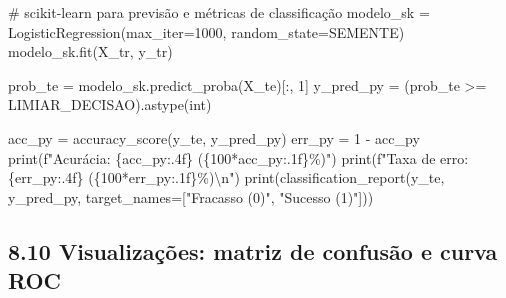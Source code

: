 \documentclass[
  letterpaper,
  DIV=11,
  numbers=noendperiod]{scrartcl}
\newenvironment{Shaded}{\begin{snugshade}}{\end{snugshade}}
\newcommand{\BuiltInTok}[1]{\textcolor[rgb]{0.00,0.23,0.31}{#1}}
\newcommand{\CharTok}[1]{\textcolor[rgb]{0.13,0.47,0.30}{#1}}
\newcommand{\CommentTok}[1]{\textcolor[rgb]{0.37,0.37,0.37}{#1}}
\newcommand{\DecValTok}[1]{\textcolor[rgb]{0.68,0.00,0.00}{#1}}
\newcommand{\NormalTok}[1]{\textcolor[rgb]{0.00,0.23,0.31}{#1}}
\newcommand{\OperatorTok}[1]{\textcolor[rgb]{0.37,0.37,0.37}{#1}}
\newcommand{\SpecialCharTok}[1]{\textcolor[rgb]{0.37,0.37,0.37}{#1}}
\newcommand{\SpecialStringTok}[1]{\textcolor[rgb]{0.13,0.47,0.30}{#1}}
\newcommand{\StringTok}[1]{\textcolor[rgb]{0.13,0.47,0.30}{#1}}
\begin{document}
\begin{Shaded}
\begin{Highlighting}[]
\CommentTok{\# scikit{-}learn para previsão e métricas de classificação}
\NormalTok{modelo\_sk }\OperatorTok{=}\NormalTok{ LogisticRegression(max\_iter}\OperatorTok{=}\DecValTok{1000}\NormalTok{, random\_state}\OperatorTok{=}\NormalTok{SEMENTE)}
\NormalTok{modelo\_sk.fit(X\_tr, y\_tr)}

\NormalTok{prob\_te   }\OperatorTok{=}\NormalTok{ modelo\_sk.predict\_proba(X\_te)[:, }\DecValTok{1}\NormalTok{]}
\NormalTok{y\_pred\_py }\OperatorTok{=}\NormalTok{ (prob\_te }\OperatorTok{\textgreater{}=}\NormalTok{ LIMIAR\_DECISAO).astype(}\BuiltInTok{int}\NormalTok{)}

\NormalTok{acc\_py  }\OperatorTok{=}\NormalTok{ accuracy\_score(y\_te, y\_pred\_py)}
\NormalTok{err\_py  }\OperatorTok{=} \DecValTok{1} \OperatorTok{{-}}\NormalTok{ acc\_py}
\BuiltInTok{print}\NormalTok{(}\SpecialStringTok{f"Acurácia:     }\SpecialCharTok{\{}\NormalTok{acc\_py}\SpecialCharTok{:.4f\}}\SpecialStringTok{  (}\SpecialCharTok{\{}\DecValTok{100}\OperatorTok{*}\NormalTok{acc\_py}\SpecialCharTok{:.1f\}}\SpecialStringTok{\%)"}\NormalTok{)}
\BuiltInTok{print}\NormalTok{(}\SpecialStringTok{f"Taxa de erro: }\SpecialCharTok{\{}\NormalTok{err\_py}\SpecialCharTok{:.4f\}}\SpecialStringTok{  (}\SpecialCharTok{\{}\DecValTok{100}\OperatorTok{*}\NormalTok{err\_py}\SpecialCharTok{:.1f\}}\SpecialStringTok{\%)}\CharTok{\textbackslash{}n}\SpecialStringTok{"}\NormalTok{)}
\BuiltInTok{print}\NormalTok{(classification\_report(y\_te, y\_pred\_py,}
\NormalTok{                             target\_names}\OperatorTok{=}\NormalTok{[}\StringTok{"Fracasso (0)"}\NormalTok{, }\StringTok{"Sucesso (1)"}\NormalTok{]))}
\end{Highlighting}
\end{Shaded}

\subsection{8.10 Visualizações: matriz de confusão e curva
ROC}\label{visualizauxe7uxf5es-matriz-de-confusuxe3o-e-curva-roc-1}
\end{document}
